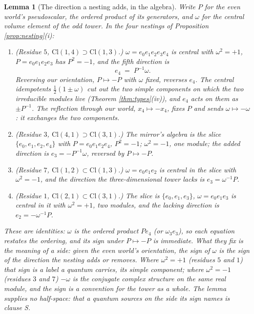 \documentclass[11pt]{article}
\newtheorem{lemma}[theorem]{Lemma}
\theoremstyle{definition}
\newcommand{\Cl}{\mathrm{Cl}}
\begin{document}
\begin{lemma}[The direction a nesting adds, in the algebra]\label{lem:fifth}
Write $P$ for the even world's pseudoscalar, the ordered product of its generators, and $\omega$ for the central volume element of the odd tower. In the four nestings of Proposition \ref{prop:nesting}(i):
\begin{enumerate}
\item[(i)] (Residue $5$, $\Cl(1,4) \supset \Cl(1,3)$.) $\omega = e_{0}e_{1}e_{2}e_{3}e_{4}$ is central with $\omega^{2} = +1$, $P = e_{0}e_{1}e_{2}e_{3}$ has $P^{2} = -1$, and the fifth direction is
\[
e_{4} \;=\; P^{-1}\omega .
\]
Reversing our orientation, $P \mapsto -P$ with $\omega$ fixed, reverses $e_{4}$. The central idempotents $\tfrac{1}{2}(1 \pm \omega)$ cut out the two simple components on which the two irreducible modules live (Theorem \ref{thm:types}(iv)), and $e_{4}$ acts on them as $\pm P^{-1}$. The reflection through our world, $x_{4} \mapsto -x_{4}$, fixes $P$ and sends $\omega \mapsto -\omega$: it exchanges the two components.
\item[(ii)] (Residue $3$, $\Cl(4,1) \supset \Cl(3,1)$.) The mirror's algebra is the slice $\{e_{0}, e_{1}, e_{2}, e_{4}\}$ with $P = e_{0}e_{1}e_{2}e_{4}$, $P^{2} = -1$; $\omega^{2} = -1$, one module; the added direction is $e_{3} = -P^{-1}\omega$, reversed by $P \mapsto -P$.
\item[(iii)] (Residue $7$, $\Cl(1,2) \subset \Cl(1,3)$.) $\omega = e_{0}e_{1}e_{2}$ is central in the slice with $\omega^{2} = -1$, and the direction the three-dimensional tower lacks is $e_{3} = \omega^{-1}P$.
\item[(iv)] (Residue $1$, $\Cl(2,1) \subset \Cl(3,1)$.) The slice is $\{e_{0}, e_{1}, e_{3}\}$, $\omega = e_{0}e_{1}e_{3}$ is central in it with $\omega^{2} = +1$, two modules, and the lacking direction is $e_{2} = -\omega^{-1}P$.
\end{enumerate}
These are identities: $\omega$ is the ordered product $P e_{4}$ (or $\omega_{3}e_{3}$), so each equation restates the ordering, and its sign under $P \mapsto -P$ is immediate. What they fix is the meaning of a side: given the even world's orientation, the sign of $\omega$ is the sign of the direction the nesting adds or removes. Where $\omega^{2} = +1$ (residues $5$ and $1$) that sign is a label a quantum carries, its simple component; where $\omega^{2} = -1$ (residues $3$ and $7$) $-\omega$ is the conjugate complex structure on the same real module, and the sign is a convention for the tower as a whole. The lemma supplies no half-space: that a quantum sources on the side its sign names is clause S.
\end{lemma}
\end{document}
